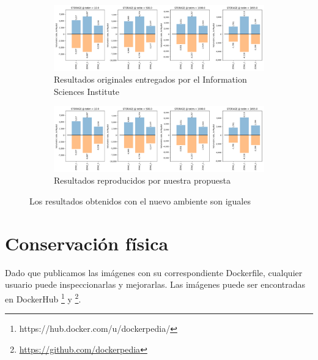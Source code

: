 \begin{figure}[]
    \centering
    \begin{subfigure}[b]{\textwidth}
         \centering
         \includegraphics[width=\textwidth]{Figures/viz-original}
         \caption{Resultados originales entregados por el Information Sciences Institute}
         \label{fig:modflow-original}
     \end{subfigure}
	
	    \begin{subfigure}[b]{\textwidth}
         \centering
         \includegraphics[width=\textwidth]{Figures/viz-reproduced}
         \caption{Resultados reproducidos por nuestra propuesta}
         \label{fig:modflow-reproduced}
     \end{subfigure}
        \caption{Los resultados obtenidos con el nuevo ambiente son iguales}
        \label{fig:both-modflow}
\end{figure}






\section{Conservación física}\label{s5.2}

Dado que publicamos las imágenes con su correspondiente Dockerfile, cualquier usuario puede inspeccionarlas y mejorarlas. Las imágenes puede ser encontradas en DockerHub \footnote{https://hub.docker.com/u/dockerpedia/} y \footnote{\url{https://github.com/dockerpedia}}. 

